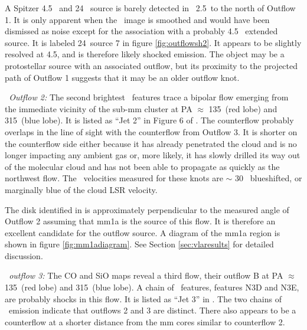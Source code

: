 A Spitzer 4.5 \um\ and 24 \um\ source is barely detected in \hh\ 2.5\arcmin\ to
the north of Outflow 1.  It is only apparent when the \hh\ image is smoothed
and would have been dismissed as noise except for the association with
a probably 4.5 \um\ extended source.  It is labeled 24\um\ source 7 in figure
\ref{fig:outflowsh2}.  It appears to be slightly resolved at 4.5\um, and is
therefore likely shocked emission.  The object may be a protostellar source 
with an associated outflow, but its proximity to the projected path of Outflow
1 suggests that it may be an older outflow knot.

{\it \region\ Outflow 2:} The second brightest \htwo\ features trace a bipolar
flow emerging from the immediate vicinity of the sub-mm cluster at PA $\approx$
135\arcdeg\ (red lobe) and 315\arcdeg\ (blue lobe).  It is listed as ``Jet 2'' in
Figure 6 of \citet{qiu2008}.  
The counterflow probably overlaps in the line of sight with the counterflow
from Outflow 3.  It is shorter on the counterflow side either because it has
already penetrated the cloud and is no longer impacting any ambient gas or,
more likely, it has slowly drilled its way out of the molecular cloud and has
not been able to propagate as quickly as the northwest flow.  
The \hh\ velocities measured for these knots are $\sim$ 30 \kms\ blueshifted, or
marginally blue of the cloud LSR velocity.  

The disk identified in \citet{Minier2000} is approximately perpendicular to the
measured angle of Outflow 2 assuming that mm1a is the source of this flow.  It
is therefore an excellent candidate for the outflow source.  A diagram of the
mm1a region is shown in figure \ref{fig:mm1adiagram}.  See Section
\ref{sec:vlaresults} for detailed discussion.



{\it \region\ outflow 3:} The \citet{beuther2002} CO and SiO maps reveal a
third flow, their outflow B at PA $\approx$ 135\arcdeg\  (red lobe) and
315\arcdeg\ (blue lobe).  A chain of  \htwo\ features, \citet{khanzadyan2004}
features N3D and N3E, are probably shocks in this flow.  It is listed as ``Jet
3'' in \citet{qiu2008}.  The two chains of \htwo\ emission indicate that
outflows 2 and 3 are distinct.  There also appears to be a counterflow at a
shorter distance from the mm cores similar to counterflow 2.  

